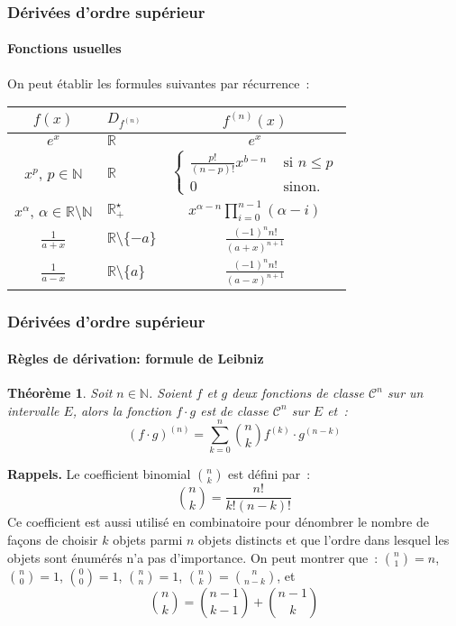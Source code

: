 \documentclass[10pt,notheorems]{beamer}
\theoremstyle{plain}
\newtheorem{theorem}{Théorème}
\theoremstyle{definition} %
\begin{document}
\begin{frame}
  \frametitle{Dérivées d'ordre supérieur}
  \framesubtitle{Fonctions usuelles}
  \hypertarget{slide_derivees_ordre_n_3}{}

  \bigskip

  On peut établir les formules suivantes par récurrence~:

  \bigskip

  \renewcommand{\arraystretch}{2}
  \begin{table}[H]
    \centering
    {\small
      \begin{tabular}{c|l|c}
        \hline
        $f(x)$ & $D_{f^{(n)}}$ & $f^{(n)}(x)$\\ \hline
        $e^x$  & $\mathbb R$ & $e^x$\\
        \multirow{2}{*}{$x^p$, $p\in\mathbb N$}  & \multirow{2}{*}{$\mathbb R$} & \multirow{2}{*}{$\begin{cases}\frac{p!}{(n-p)!}x^{b-n} & \text{ si }n\leq p\\ 0 & \text{ sinon.}\end{cases}$}\\
               & & \\
        $x^{\alpha}$, $\alpha\in\mathbb R\setminus\mathbb N$ & $\mathbb R_+^{\star}$ & $x^{\alpha-n}\prod_{i=0}^{n-1}(\alpha-i)$ \\
        $\frac{1}{a+x}$ & $\mathbb R \setminus \{-a\}$ & $\frac{(-1)^nn!}{(a+x)^{n+1}}$ \\
        $\frac{1}{a-x}$ & $\mathbb R \setminus \{a\}$ & $\frac{(-1)^nn!}{(a-x)^{n+1}}$ \\ \hline\hline
      \end{tabular}}
  \end{table}

\end{frame}


\begin{frame}
  \frametitle{Dérivées d'ordre supérieur}
  \framesubtitle{Règles de dérivation: formule de Leibniz}
  \hypertarget{slide_derivees_ordre_n_4}{}

  \begin{theorem}\label{thm:leibniz}
    Soit $n\in\mathbb N$. Soient $f$ et $g$ deux fonctions de classe
    $\mathcal C^n$ sur un intervalle $E$, alors la fonction $f\cdot g$
    est de classe $\mathcal C^n$ sur $E$ et~:
    \[
      (f\cdot g)^{(n)} = \sum_{k=0}^n \binom{n}{k}f^{(k)}\cdot g^{(n-k)}
    \]
  \end{theorem}

  \bigskip

  {\textbf{Rappels.}} Le coefficient binomial $\binom{n}{k}$ est défini par~:
  \[
    \binom{n}{k} = \frac{n!}{k!(n-k)!}
  \]
  Ce coefficient est aussi utilisé en combinatoire pour dénombrer le
  nombre de façons de choisir $k$ objets parmi $n$ objets distincts et
  que l'ordre dans lesquel les objets sont énumérés n'a pas
  d'importance. On peut montrer que~: $\binom{n}{1} = n$, $\binom{n}{0} = 1$, $\binom{0}{0} = 1$, $\binom{n}{n} = 1$, $\binom{n}{k} = \binom{n}{n-k}$, et
  \[
    \binom{n}{k} = \binom{n-1}{k-1} + \binom{n-1}{k}
  \]

\end{frame}
\end{document}
